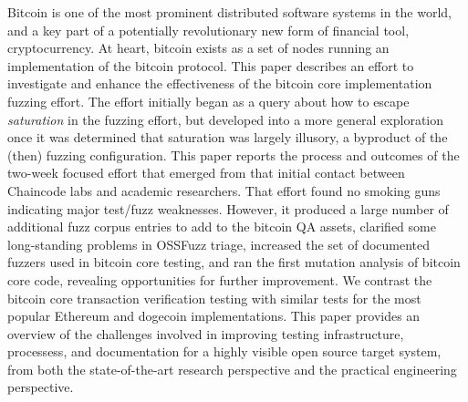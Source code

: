 Bitcoin is one of the most prominent distributed software systems in the world, and a key part of a potentially revolutionary new form of financial tool, cryptocurrency.  At heart, bitcoin exists as a set of nodes running an implementation of the bitcoin protocol.  This paper describes an effort to investigate and enhance the effectiveness of the bitcoin core implementation fuzzing effort.  The effort initially began as a query about how to escape \emph{saturation} in the fuzzing effort, but developed into a more general exploration once it was determined that saturation was largely illusory, a byproduct of the (then) fuzzing configuration.  This paper reports the process and outcomes of the two-week focused effort that emerged from that initial contact between Chaincode labs and academic researchers.  That effort found no smoking guns indicating major test/fuzz weaknesses. However, it produced a large number of additional fuzz corpus entries to add to the bitcoin QA assets, clarified some long-standing problems in OSSFuzz triage, increased the set of documented fuzzers used in bitcoin core testing, and ran the first mutation analysis of bitcoin core code, revealing opportunities for further improvement.  We contrast the bitcoin core transaction verification testing with similar tests for the most popular Ethereum and dogecoin implementations.  This paper provides an overview of the challenges involved in improving testing infrastructure, processess, and documentation for a highly visible open source target system, from both the state-of-the-art research perspective and the practical engineering perspective.